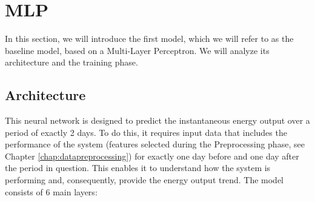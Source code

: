 \section{MLP}\label{sec:mlpbaseline}
In this section, we will introduce the first model, which we will refer to as the
baseline model, based on a Multi-Layer Perceptron.
We will analyze its architecture and the training phase.


\subsection{Architecture}
This neural network is designed to predict the instantaneous energy output over
a period of exactly 2 days.
To do this, it requires input data that includes the performance of the system
(features selected during the Preprocessing phase, see Chapter \ref{chap:datapreprocessing}) for exactly one day
before and one day after the period in question.
This enables it to understand how the system is performing and,
consequently, provide the energy output trend.
The model consists of 6 main layers:


